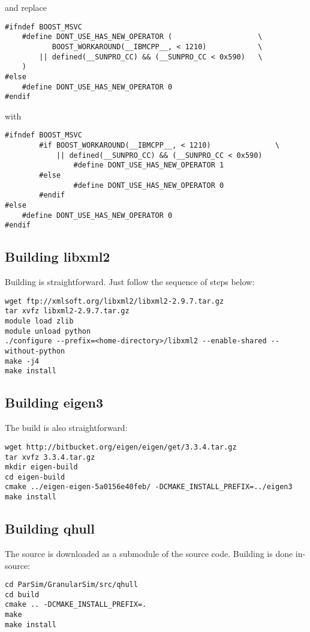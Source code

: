 \documentclass[11pt,fleqn]{book} %
\begin{document}
and replace
\begin{lstlisting}[backgroundcolor=\color{background}]
#ifndef BOOST_MSVC
    #define DONT_USE_HAS_NEW_OPERATOR (                    \
           BOOST_WORKAROUND(__IBMCPP__, < 1210)            \
        || defined(__SUNPRO_CC) && (__SUNPRO_CC < 0x590)   \
    )
#else
    #define DONT_USE_HAS_NEW_OPERATOR 0
#endif
\end{lstlisting}
with
\begin{lstlisting}[backgroundcolor=\color{background}]
#ifndef BOOST_MSVC
        #if BOOST_WORKAROUND(__IBMCPP__, < 1210)               \
            || defined(__SUNPRO_CC) && (__SUNPRO_CC < 0x590)
                #define DONT_USE_HAS_NEW_OPERATOR 1
        #else
                #define DONT_USE_HAS_NEW_OPERATOR 0
        #endif
#else
    #define DONT_USE_HAS_NEW_OPERATOR 0
#endif
\end{lstlisting}

\subsection{Building libxml2}
Building  is straightforward.  Just follow the sequence of steps below:

\begin{lstlisting}[backgroundcolor=\color{background}]
wget ftp://xmlsoft.org/libxml2/libxml2-2.9.7.tar.gz
tar xvfz libxml2-2.9.7.tar.gz
module load zlib
module unload python
./configure --prefix=<home-directory>/libxml2 --enable-shared --without-python
make -j4
make install
\end{lstlisting}

\subsection{Building eigen3}
The  build is also straightforward:

\begin{lstlisting}[backgroundcolor=\color{background}]
wget http://bitbucket.org/eigen/eigen/get/3.3.4.tar.gz
tar xvfz 3.3.4.tar.gz
mkdir eigen-build
cd eigen-build
cmake ../eigen-eigen-5a0156e40feb/ -DCMAKE_INSTALL_PREFIX=../eigen3
make install
\end{lstlisting}

\subsection{Building qhull}
The  source is downloaded as a submodule of the  source code.
Building  is done in-source:
\begin{lstlisting}[backgroundcolor=\color{background}]
cd ParSim/GranularSim/src/qhull
cd build
cmake .. -DCMAKE_INSTALL_PREFIX=.
make
make install
\end{lstlisting}
\end{document}

